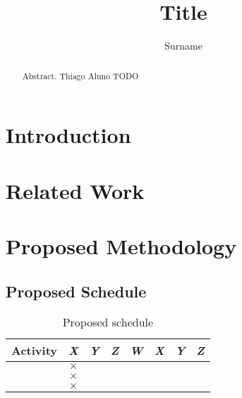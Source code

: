 \documentclass[ppgc,tc,english]{iiufrgs}
\title{Title}
\author{Surname}{Name}
\newcommand{\tlts}[1]{{\color{red}#1}}
\newcommand{\aluno}[1]{{\color{blue}#1}}
\newcommand{\todo}[1]{{\color{orange}#1}}
\begin{document}
 



\maketitle

\begin{abstract}
Abstract.
    \tlts{Thiago}
    \aluno{Aluno}
    \todo{TODO}

\end{abstract}
\tableofcontents
\chapter{Introduction}


\chapter{Related Work}


\chapter{Proposed Methodology}

\section{Proposed Schedule}

\begin{table}[h]
    \caption{Proposed schedule}
    \centering
        \begin{tabular}{c|c|c|c|c|c|c|c}
          \hline
          {Activity}  &   \textit{X}  &   \textit{Y}  &   \textit{Z}  &   \textit{W}  &   \textit{X}  &   \textit{Y}  &   \textit{Z}\\
          \hline
                  & $\times$& & & & & &   \\
                  & $\times$& & & & & &   \\
                  & $\times$& & & & & &   \\
          \hline
        \end{tabular}
     \label{tbl:ex1}
\end{table}




\end{document}

